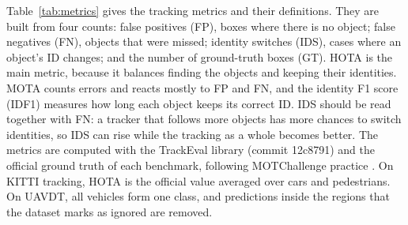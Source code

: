 \documentclass[pdflatex,sn-mathphys-num,iicol]{sn-jnl}
\begin{document}
\label{sec:metrics}Table~\ref{tab:metrics} gives the tracking metrics and
their definitions. They are built from four counts: false positives (FP),
boxes where there is no object; false negatives (FN), objects that were
missed; identity switches (IDS), cases where an object's ID changes; and the
number of ground-truth boxes (GT). HOTA is the main metric, because it
balances finding the objects and keeping their identities. MOTA counts errors
and reacts mostly to FP and FN, and the identity F1 score (IDF1) measures how
long each object keeps its correct ID. IDS should be read together with FN: a
tracker that follows more objects has more chances to switch identities, so
IDS can rise while the tracking as a whole becomes better. The metrics are
computed with the TrackEval library (commit 12c8791) and the official ground
truth of each benchmark, following MOTChallenge practice
\cite{dendorfer2021motchallenge}. On KITTI tracking, HOTA is the official
value averaged over cars and pedestrians. On UAVDT, all vehicles form one
class, and predictions inside the regions that the dataset marks as ignored
are removed.
\end{document}
